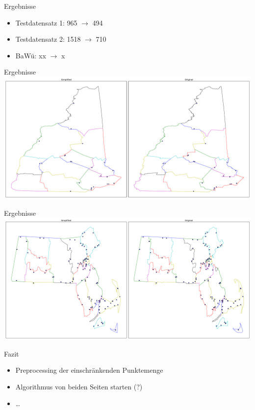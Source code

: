 \documentclass[14pt]{beamer}
\begin{document}
\begin{frame}{Ergebnisse}
\begin{itemize}
	\item Testdatensatz 1: 965 $\rightarrow$ 494
	\item Testdatensatz 2: 1518 $\rightarrow$ 710
	\item BaWü: xx $\rightarrow$ x
\end{itemize}
\end{frame}

\begin{frame}{Ergebnisse}
\includegraphics[width=1.25\textwidth,center]{img/result_dataset1.pdf}
\end{frame}

\begin{frame}{Ergebnisse}
\includegraphics[width=1.25\textwidth,center]{img/result_dataset2.pdf}
\end{frame}

\begin{frame}{Fazit}
\begin{itemize}
	\item Preprocessing der einschränkenden Punktemenge
	\item Algorithmus von beiden Seiten starten (?)
	\item \dots
\end{itemize}
\end{frame}
\end{document}
